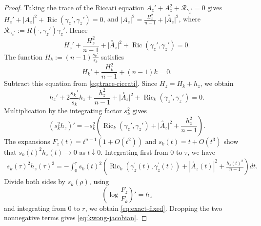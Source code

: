 \documentclass[11pt, reqno]{amsart}
\begin{document}
\begin{proof}
Taking the trace of the Riccati equation $A_z'+A_z^2+\mathcal R_{\gamma_z'}=0$ gives $H_z'+\lvert A_z\rvert^2+\operatorname{Ric}(\gamma_z', \gamma_z')=0$, and $\lvert A_z\rvert^2=\frac{H_z^2}{ n-1 }+ \lvert\stackrel{\circ}{A}_z\rvert^2$, where $\mathcal R_{\gamma_z'}:=R(\cdot, \gamma_z')\gamma_z'$. Hence
\begin{equation}\label{eq:trace-riccati}
H_z'+\frac{H_z^2}{n-1} +\lvert\stackrel{\circ}{A}_z\rvert^2 +\operatorname{Ric}(\gamma_z', \gamma_z')=0.
\end{equation}
The function $H_k:=(n-1)\frac{s_k'}{s_k}$ satisfies
$$H_k'+\frac{H_k^2}{n-1}+(n-1)k=0. $$
Subtract this equation from \eqref{eq:trace-riccati}. Since $H_z=H_k+h_z$, we obtain
\begin{equation*}\label{eq:h-equation}
h_z'+2\frac{s_k'}{s_k}h_z+\frac{h_z^2}{n-1} +\lvert\stackrel{\circ}{A}_z\rvert^2 +\operatorname{Ric}_k(\gamma_z', \gamma_z')=0.
\end{equation*}
Multiplication by the integrating factor $s_k^2$ gives
$$
(s_k^2h_z)'=-s_k^2 \left(\operatorname{Ric}_k(\gamma_z', \gamma_z') +\lvert\stackrel{\circ}{A}_z\rvert^2 +\frac{h_z^2}{n-1} \right).
$$
The expansions $F_z(t)=t^{n-1}(1+O(t^2))$ and $s_k(t)=t+O(t^3)$ show that $s_k(t)^2h_z(t)\to0$ as $t\downarrow0$. Integrating first from $0$ to $\tau$, we have
\begin{align*}
s_k(\tau)^2h_z(\tau)^2=-\int_{0}^{\tau}s_k(t)^2\left(\operatorname{Ric}_k\left(\gamma_z^{\prime}(t), \gamma_z^{\prime}(t)\right)+\left|\stackrel{\circ}{A}_z(t)\right|^2+\frac{h_z(t)^2}{n-1}\right)dt.
\end{align*}
Divide both sides by $s_k(\rho)$, using
$$\left(\log\frac{F_z}{F_k}\right)'=h_z
$$
and integrating from $0$ to $r$, we obtain \eqref{eq:exact-fixed}. Dropping the two nonnegative terms gives \eqref{eq:kwong-jacobian}.
\end{proof}
\end{document}
